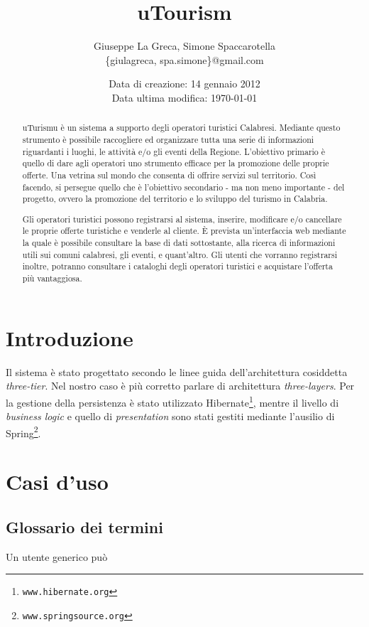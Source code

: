 \documentclass[a4paper,11pt]{report}
\title{uTourism}
\author{Giuseppe La Greca, Simone Spaccarotella\\\small{\{giulagreca, spa.simone\}@gmail.com}}
\date{\small{Data di creazione: 14 gennaio 2012\\Data ultima modifica: \today}}
\begin{document}
  \maketitle
  \tableofcontents

  \begin{abstract}
    uTurismu è un sistema a supporto degli operatori turistici Calabresi. Mediante questo strumento è possibile  
    raccogliere ed organizzare tutta una serie di informazioni riguardanti i luoghi, le attività e/o gli eventi della 
    Regione. L'obiettivo primario è quello di dare agli operatori uno strumento efficace per la promozione delle proprie 
    offerte. Una vetrina sul mondo che consenta di offrire servizi sul territorio. Così facendo, si persegue quello che 
    è l'obiettivo secondario - ma non meno importante - del progetto, ovvero la promozione del territorio e lo sviluppo 
    del turismo in Calabria.

    Gli operatori turistici possono registrarsi al sistema, inserire, modificare e/o cancellare le proprie offerte 
    turistiche e venderle al cliente. È prevista un'interfaccia web mediante la quale è possibile consultare la base di 
    dati sottostante, alla ricerca di informazioni utili sui comuni calabresi, gli eventi, e quant'altro. Gli utenti che 
    vorranno registrarsi inoltre, potranno consultare i cataloghi degli operatori turistici e acquistare l'offerta più 
    vantaggiosa.
  \end{abstract}

  \chapter{Introduzione}
    Il sistema è stato progettato secondo le linee guida dell'architettura cosiddetta \textit{three-tier}. Nel nostro 
    caso è più corretto parlare di architettura \textit{three-layers}. Per la gestione della persistenza è stato 
    utilizzato Hibernate\footnote{\texttt{www.hibernate.org}}, mentre il livello di \textit{business logic} e quello di 
    \textit{presentation} sono stati gestiti mediante l'ausilio di Spring\footnote{\texttt{www.springsource.org}}.
    
  \chapter{Casi d'uso}
    \section{Glossario dei termini}
      Un utente generico può
    
\end{document}
